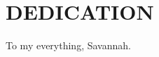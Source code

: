 %
%
%
%
\chapter*{DEDICATION}


\begin{center}
\vspace*{\fill}
To my everything, Savannah.
\vspace*{\fill}
\end{center}

\pagebreak{}
